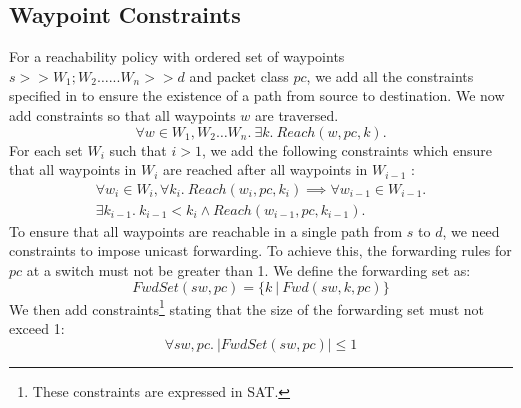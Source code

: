 \subsection{Waypoint Constraints} 
For a reachability policy with ordered set of waypoints $s >> W_1;W_2 \ldots ... W_n >> d$ and packet class $pc$, we add all the constraints specified in  to ensure the existence of a path from source to destination. We now add constraints so that all waypoints $w$
are traversed. 
\begin{equation} \label{eq:waypoints}
	\forall w \in W_1, W_2 \ldots W_n. \ \exists k.~Reach(w, pc, k).
\end{equation}
For each set $W_i$  such that $i>1$, we add the following constraints which ensure that all waypoints
in $W_i$ are reached after all waypoints in $W_{i - 1}$ : 
\begin{multline}
\forall w_{i} \in W_{i}, \forall k_i.~Reach(w_i, pc, k_i) \implies 
\forall w_{i - 1} \in W_{i-1}. \\ \exists k_{i-1}. \ 
 k_{i-1} < k_{i} \wedge Reach(w_{i-1}, pc, k_{i-1}).
\end{multline}
To ensure that all waypoints are reachable in a single path from
$s$ to $d$, we need constraints to impose unicast forwarding. To achieve
this, the forwarding rules for $pc$ at a switch must not be greater than 1. 
We define the forwarding set as:
\begin{equation}
	FwdSet(sw,pc) = \{k \ | \ Fwd(sw,k,pc)\}
\end{equation}
We then add constraints\footnote{
	These constraints are expressed in SAT.} stating that the size of the forwarding set must not exceed 1:
\begin{equation}
		\forall sw,pc .\ |FwdSet(sw,pc)| \leq 1 \label{eq:fwdset}
\end{equation}
